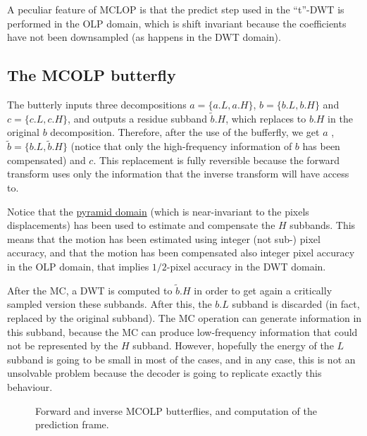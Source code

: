 A peculiar feature of MCLOP is that the predict step used in the
``t''-DWT is performed in the OLP domain, which is shift invariant
because the coefficients have not been downsampled (as happens in the
DWT domain).


\subsection{The MCOLP butterfly}

The butterly inputs three decompositions $a=\{a.L, a.H\}$, $b=\{b.L,
b.H\}$ and $c=\{c.L, c.H\}$, and outputs a residue subband
$\tilde{b}.H$, which replaces to $b.H$ in the original $b$
decomposition. Therefore, after the use of the bufferfly, we get $a$ ,
$\tilde{b}=\{b.L, \tilde{b}.H\}$ (notice that only the high-frequency
information of $b$ has been compensated) and $c$. This replacement is
fully reversible because the forward transform uses only the
information that the inverse transform will have access to.

Notice that the
\href{http://www.vtvt.ece.vt.edu/research/references/video/DCT_Video_Compression/Zhang92a.pdf}{pyramid
  domain} (which is near-invariant to the pixels displacements) has
been used to estimate and compensate the $H$ subbands. This means that
the motion has been estimated using integer (not sub-) pixel accuracy,
and that the motion has been compensated also integer pixel accuracy
in the OLP domain, that implies $1/2$-pixel accuracy in the DWT
domain.

After the MC, a DWT is computed to $\tilde{b}.H$ in order to get again
a critically sampled version these subbands. After this, the $b.L$
subband is discarded (in fact, replaced by the original subband). The
MC operation can generate information in this subband, because the MC
can produce low-frequency information that could not be represented by
the $H$ subband. However, hopefully the energy of the $L$ subband is
going to be small in most of the cases, and in any case, this is not
an unsolvable problem because the decoder is going to replicate
exactly this behaviour.

\begin{figure}
  \centering {}
  
  
  \caption{Forward and inverse MCOLP butterflies, and computation of
    the prediction frame.}
  \label{fig:forward_butterfly}
\end{figure}

